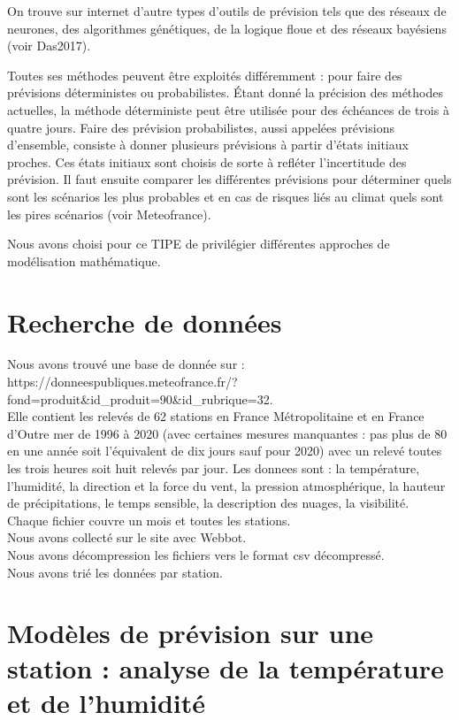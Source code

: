 \documentclass[11pt,a4paper]{article}
\begin{document}
On trouve sur internet d'autre types d'outils de prévision tels que des réseaux de neurones, des algorithmes génétiques, de la logique floue et des réseaux bayésiens %
 (voir Das2017).

Toutes ses méthodes peuvent être exploités différemment : pour faire des prévisions déterministes ou probabilistes. Étant donné la précision des méthodes actuelles, la méthode déterministe peut être utilisée pour des échéances de trois à quatre jours. Faire des prévision probabilistes, aussi appelées prévisions d'ensemble, consiste à donner plusieurs prévisions à partir d'états initiaux proches. Ces états initiaux sont choisis de sorte à refléter l'incertitude des prévision. Il faut ensuite comparer les différentes prévisions pour déterminer quels sont les scénarios les plus probables et en cas de risques liés au climat quels sont les pires scénarios (voir Meteofrance).

\vspace{0.6cm}
Nous avons choisi pour ce TIPE de privilégier différentes approches de modélisation mathématique.

\section{Recherche de données}

Nous avons trouvé une base de donnée sur  : \\
https://donneespubliques.meteofrance.fr/?fond=produit\&id\_produit=90\&id\_rubrique=32. \\
Elle contient les relevés de 62 stations en France Métropolitaine et en France d’Outre mer
de 1996 à 2020  (avec certaines mesures manquantes : pas plus de 80 en une année soit l'équivalent de dix jours sauf pour 2020)
avec un relevé toutes les trois heures soit huit relevés par jour.
Les donnees sont : la température, l'humidité, la direction et la force du vent, la pression atmosphérique, la hauteur de précipitations, le temps sensible, la description des nuages, la visibilité.
Chaque fichier couvre un mois et toutes les stations. \\
Nous avons collecté sur le site avec Webbot. \\
Nous avons décompression les fichiers vers le format csv décompressé. \\
Nous avons trié les données par station. \\

\section{Modèles de prévision sur une station : analyse de la température et de l'humidité}
\end{document}
